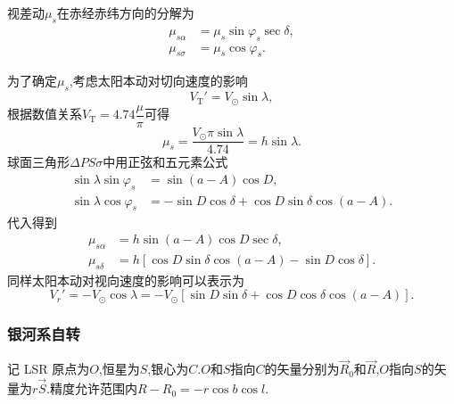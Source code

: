 \documentclass[11pt, a4paper, oneside]{ctexart}
\numberwithin{equation}{subsection}
\begin{document}
视差动$\mu_{s}$在赤经赤纬方向的分解为
\begin{align}
\mu_{s\alpha}&=\mu_s\sin\varphi_s\sec\delta,\\
\mu_{s\sigma}&=\mu_s\cos\varphi_s.
\end{align}

为了确定$\mu_{s}$,考虑太阳本动对切向速度的影响
\begin{equation}
V_{\text{T}}'=V_{\odot}\sin\lambda,
\end{equation}
根据数值关系$V_{\text{T}}=4.74\dfrac{\mu}{\pi}$可得
\begin{equation}
\mu_{s}=\frac{V_{\odot}\pi\sin\lambda}{4.74}=h\sin\lambda.
\end{equation}
球面三角形$\Delta{}PS\sigma$中用正弦和五元素公式
\begin{align}
\sin\lambda\sin\varphi_s&=\sin\left(a-A\right)\cos D,\\
\sin\lambda\cos\varphi_s&=-\sin D\cos\delta+\cos D\sin\delta\cos\left(a-A\right).
\end{align}
代入得到
\begin{align}
\mu_{s\alpha}&=h\sin\left(a-A\right)\cos D\sec\delta,\\
\mu_{s\delta}&=h\left[\cos D\sin\delta\cos\left(a-A\right)-\sin D\cos\delta\right].
\end{align}
同样太阳本动对视向速度的影响可以表示为
\begin{equation}
V_r'=-V_\odot\cos\lambda=-V_\odot\left[\sin D\sin\delta+\cos D\cos\delta\cos\left(a-A\right)\right].
\end{equation}

\subsubsection{银河系自转}
记 LSR 原点为$O$,恒星为$S$,银心为$C$.$O$和$S$指向$C$的矢量分别为$\vec{R}_{0}$和$\vec{R}$,$O$指向$S$的矢量为$r\vec{S}$.精度允许范围内$R-R_{0}=-r\cos b\cos l$.
\end{document}
